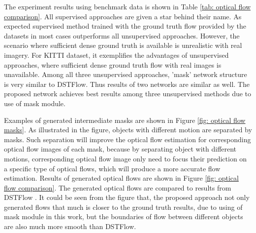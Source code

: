 \documentclass{iitthesis}
\begin{document}
The experiment results using benchmark data is shown in Table \ref{tab: optical flow comparison}. All supervised approaches are given a star behind their name. As expected supervised method trained with the ground truth flow provided by the datasets in most cases outperforms all unsupervised approaches. However, the scenario where sufficient dense ground truth is available is unrealistic with real imagery. For KITTI dataset, it exemplifies the advantages of unsupervised approaches, where sufficient dense ground truth flow with real images is unavailable. Among all three unsupervised approaches, 'mask' network structure is very similar to DSTFlow. Thus results of two networks are similar as well. The proposed network achieves best results among three unsupervised methods due to use of mask module. 



Examples of generated intermediate masks are shown in Figure \ref{fig: optical flow masks}. As illustrated in the figure, objects with different motion are separated by masks. Such separation will improve the optical flow estimation for corresponding optical flow images of each mask, because by separating object with different motions, corresponding optical flow image only need to focus their prediction on a specific type of optical flows, which will produce a more accurate flow estimation. Results of generated optical flows are shown in Figure \ref{fig: optical flow comparison}. The generated optical flows are compared to results from DSTFlow \cite{ren2017unsupervised}. It could be seen from the figure that, the proposed approach not only generated flows that much is closer to the ground truth results, due to using of mask module in this work, but the boundaries of flow between different objects are also much more smooth than DSTFlow.
\end{document}

